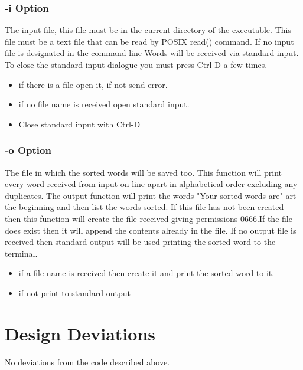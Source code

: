 \documentclass[letterpaper,10pt,notitlepage,fleqn]{article}
\begin{document}
\subsubsection*{-i     Option}       
The input file, this file must be in the current directory of the executable. This file must be a text file that
can be read by POSIX read() command. If no input file is designated in the command line Words will be received via
standard input. To close the standard input dialogue you must press Ctrl-D a few times. 
\begin{itemize}
\item if there is a file open it, if not send error.
\item if no file name is received open standard input.
\item Close standard input with Ctrl-D
\end{itemize}

\subsubsection*{-o     Option}
The file in which the sorted words will be saved too. This function will print every word received from input on
line apart in alphabetical order excluding any duplicates. The output function will print the words "Your sorted
words are" art the beginning and then list the words sorted. If this file has not been created then this function
will create the file received giving permissions 0666.If the file does exist then it will append the contents
already in the file. If no output file is received then standard output will be
used printing the sorted word to the terminal.
\begin{itemize}
\item if a file name is received then create it and print the sorted word to it.
\item if not print to standard output
\end{itemize}


\section*{Design Deviations}
No deviations from the code described above.
 
\end{document}
